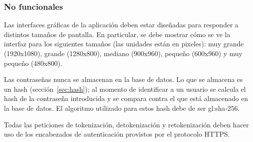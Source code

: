 %
%

\subsubsection{No funcionales}

{
  Las interfaces gráficas de la aplicación deben estar diseñadas para
  responder a distintos tamaños de pantalla. En particular, se debe
  mostrar cómo se ve la interfaz para los siguientes tamaños (las unidades están
  en pixeles): muy grande (1920x1080), grande (1280x800), mediano (900x960),
  pequeño (600x960) y muy pequeño (480x800).
}

{
  Las contraseñas nunca se almacenan en la base de datos. Lo que se almacena es
  un hash (sección~\ref{sec:hash}); al momento de identificar a un usuario
  se calcula el hash de la contraseña introducida y se compara contra el que
  está almacenado en la base de datos. El algoritmo utilizado para estos hash 
  debe de ser \gls{gl:sha}-256.
}

{
  Todas las peticiones de tokenización, detokenización y retokenización deben
  hacer uso de los encabezados de autenticación provistos por el protocolo
  HTTPS.
}
